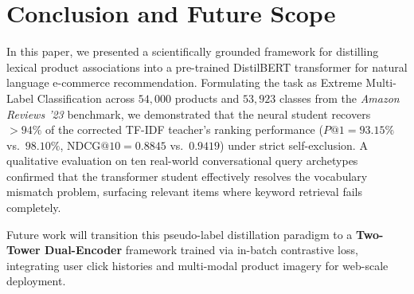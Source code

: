 \documentclass[11pt]{article}
\begin{document}
\section{Conclusion and Future Scope}\label{sec:conclusion}

In this paper, we presented a scientifically grounded framework for distilling lexical product associations into a pre-trained DistilBERT transformer for natural language e-commerce recommendation. Formulating the task as Extreme Multi-Label Classification across $54{,}000$ products and $53{,}923$ classes from the \textit{Amazon Reviews '23} benchmark, we demonstrated that the neural student recovers $>94\%$ of the corrected TF-IDF teacher's ranking performance ($P@1 = 93.15\%$ vs.\ $98.10\%$, $\text{NDCG}@10 = 0.8845$ vs.\ $0.9419$) under strict self-exclusion. A qualitative evaluation on ten real-world conversational query archetypes confirmed that the transformer student effectively resolves the vocabulary mismatch problem, surfacing relevant items where keyword retrieval fails completely.

Future work will transition this pseudo-label distillation paradigm to a \textbf{Two-Tower Dual-Encoder} framework trained via in-batch contrastive loss, integrating user click histories and multi-modal product imagery for web-scale deployment.
\end{document}
